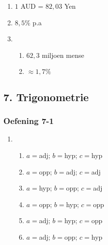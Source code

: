 {\begin{multicols}{3}
\begin{enumerate}[label=\textbf{\arabic*}.]
	\item $1$ AUD = $82,03$ Yen%

	\item $8,5\%$ p.a%

\item
\begin{enumerate}[noitemsep, label=\textbf{(\alph*)} ]
    \item $62,3$ miljoen mense
    \item $\approx 1,7\%$
\end{enumerate}

    \end{enumerate}


\end{multicols}

\subsection* {7. Trigonometrie}
\begin{multicols}{3}
\subsubsection*{Oefening 7-1} %

\begin{enumerate}[noitemsep, label=\textbf{\arabic*}. ]
\item %
\begin{enumerate}[noitemsep, label=\textbf{(\alph*)} ]
\item $a=$adj; $b=$hyp; $c=$hyp
\item $a=$opp; $b=$adj; $c=$adj
\item $a=$hyp; $b=$opp; $c=$adj
\item $a=$opp; $b=$hyp; $c=$opp
\item $a=$adj; $b=$hyp; $c=$opp
\item $a=$adj; $b=$opp; $c=$hyp
\end{enumerate}




\end{enumerate}
\end{multicols}}
